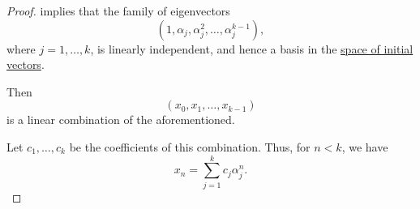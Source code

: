 \begin{proof}
   implies that the family of eigenvectors
  \begin{equation*}
    (1, \alpha_j, \alpha_j^2, \ldots, \alpha_j^{k-1}),
  \end{equation*}
  where \( j = 1, \ldots, k \), is linearly independent, and hence a basis in the \hyperref[def:recurrence_relation_space]{space of initial vectors}.

  Then
  \begin{equation*}
    (x_0, x_1, \ldots, x_{k-1})
  \end{equation*}
  is a linear combination of the aforementioned.

  Let \( c_1, \ldots, c_k \) be the coefficients of this combination. Thus, for \( n < k \), we have
  \begin{equation*}
    x_n = \sum_{j=1}^k c_j \alpha_j^n.
  \end{equation*}


\end{proof}
